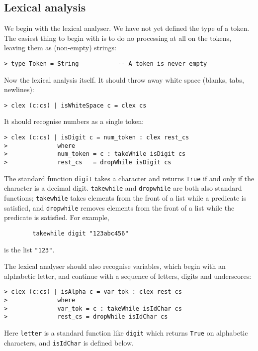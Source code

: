 \subsection{Lexical analysis}

We begin with the lexical analyser.  We have not yet defined the type of
a token.  The easiest thing to begin with is to do no processing at all
on the tokens, leaving them as (non-empty) strings:
\begin{verbatim}
> type Token = String           -- A token is never empty
\end{verbatim}
%
Now the lexical analysis itself.  It should throw away white space (blanks,
tabs, newlines):
\begin{verbatim}
> clex (c:cs) | isWhiteSpace c = clex cs
\end{verbatim}
%
It should recognise numbers as a single token:
\begin{verbatim}
> clex (c:cs) | isDigit c = num_token : clex rest_cs
>              where
>              num_token = c : takeWhile isDigit cs
>              rest_cs   = dropWhile isDigit cs
\end{verbatim}
%
\par
The standard function \mbox{\tt digit} takes a character and returns \mbox{\tt True} if and only
if the character is a decimal digit.  \mbox{\tt takewhile} and \mbox{\tt dropwhile} are both
also standard functions; \mbox{\tt takewhile} takes elements from the front of a list
while a predicate is satisfied, and \mbox{\tt dropwhile} removes elements from the front
of a list while the predicate is satisfied.  For example,
\begin{verbatim}
        takewhile digit "123abc456"
\end{verbatim}
is the list \mbox{\tt "123"}.

The lexical analyser should also recognise variables, which begin with
an alphabetic letter, and continue with a sequence of letters, digits and
underscores:
\begin{verbatim}
> clex (c:cs) | isAlpha c = var_tok : clex rest_cs
>              where
>              var_tok = c : takeWhile isIdChar cs
>              rest_cs = dropWhile isIdChar cs
\end{verbatim}
%
Here \mbox{\tt letter} is a standard function like \mbox{\tt digit} which returns \mbox{\tt True} on
alphabetic characters, and \mbox{\tt isIdChar} is defined below.

